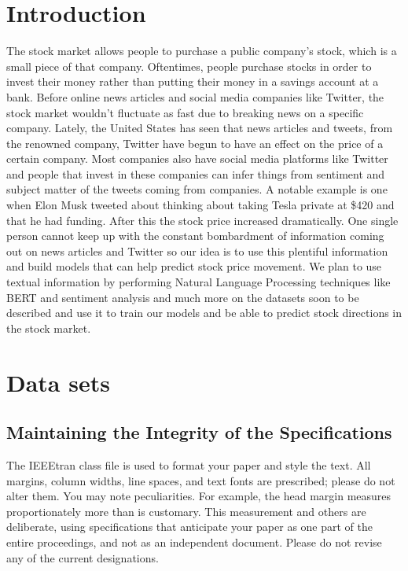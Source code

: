 \documentclass[conference]{IEEEtran}
\begin{document}
\section{Introduction}
The stock market allows people to purchase a public company’s stock, which is a small piece of that company. Oftentimes, people purchase stocks in order to invest their money rather than putting their money in a savings account at a bank. Before online news articles and social media companies like Twitter, the stock market wouldn’t fluctuate as fast due to breaking news on a specific company. Lately, the United States has seen that news articles and tweets, from the renowned company, Twitter have begun to have an effect on the price of a certain company. Most companies also have social media platforms like Twitter and people that invest in these companies can infer things from sentiment and subject matter of the tweets coming from companies. A notable example is one when Elon Musk tweeted about thinking about taking Tesla private at \$420 and that he had funding. After this the stock price increased dramatically. One single person cannot keep up with the constant bombardment of information coming out on news articles and Twitter so our idea is to use this plentiful information and build models that can help predict stock price movement. We plan to use textual information by performing Natural Language Processing techniques like BERT and sentiment analysis and much more on the datasets soon to be described and use it to train our models and be able to predict stock directions in the stock market.

\section{Data sets}

\subsection{Maintaining the Integrity of the Specifications}

The IEEEtran class file is used to format your paper and style the text. All margins, 
column widths, line spaces, and text fonts are prescribed; please do not 
alter them. You may note peculiarities. For example, the head margin
measures proportionately more than is customary. This measurement 
and others are deliberate, using specifications that anticipate your paper 
as one part of the entire proceedings, and not as an independent document. 
Please do not revise any of the current designations.
\end{document}
